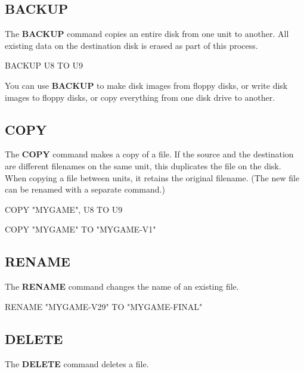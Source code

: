 \subsection{BACKUP}

The {\bf BACKUP} command copies an entire disk from one unit to another. All existing data on the destination disk is erased as part of this process.

\begin{screencode}
BACKUP U8 TO U9
\end{screencode}

You can use {\bf BACKUP} to make disk images from floppy disks, or write disk images to floppy disks, or copy everything from one disk drive to another.

\subsection{COPY}

The {\bf COPY} command makes a copy of a file. If the source and the destination are different filenames on the same unit, this duplicates the file on the disk. When copying a file between units, it retains the original filename. (The new file can be renamed with a separate command.)

\begin{screencode}
COPY "MYGAME", U8 TO U9

COPY "MYGAME" TO "MYGAME-V1"
\end{screencode}

\subsection{RENAME}

The {\bf RENAME} command changes the name of an existing file.

\begin{screencode}
RENAME "MYGAME-V29" TO "MYGAME-FINAL"
\end{screencode}

\subsection{DELETE}

The {\bf DELETE} command deletes a file.

